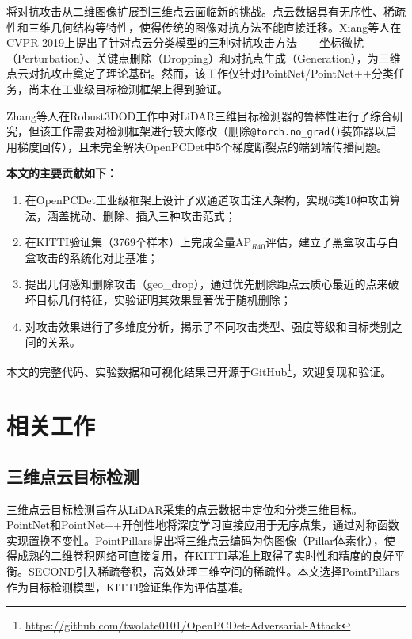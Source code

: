 ﻿\documentclass[12pt,a4paper]{ctexart}
\begin{document}
将对抗攻击从二维图像扩展到三维点云面临新的挑战。点云数据具有无序性、稀疏性和三维几何结构等特性，使得传统的图像对抗方法不能直接迁移。Xiang等人\cite{xiang2019generating}在CVPR 2019上提出了针对点云分类模型的三种对抗攻击方法——坐标微扰（Perturbation）、关键点删除（Dropping）和对抗点生成（Generation），为三维点云对抗攻击奠定了理论基础。然而，该工作仅针对PointNet/PointNet++分类任务，尚未在工业级目标检测框架上得到验证。

Zhang等人\cite{zhang2023robust3dod}在Robust3DOD工作中对LiDAR三维目标检测器的鲁棒性进行了综合研究，但该工作需要对检测框架进行较大修改（删除\texttt{@torch.no\_grad()}装饰器以启用梯度回传），且未完全解决OpenPCDet中5个梯度断裂点的端到端传播问题。

\textbf{本文的主要贡献如下：}
\begin{enumerate}[label=(\arabic*)]
  \item 在OpenPCDet工业级框架\cite{openpcdet2020}上设计了双通道攻击注入架构，实现6类10种攻击算法，涵盖扰动、删除、插入三种攻击范式；
  \item 在KITTI验证集（3769个样本）上完成全量$\text{AP}_{R40}$评估，建立了黑盒攻击与白盒攻击的系统化对比基准；
  \item 提出几何感知删除攻击（geo\_drop），通过优先删除距点云质心最近的点来破坏目标几何特征，实验证明其效果显著优于随机删除；
  \item 对攻击效果进行了多维度分析，揭示了不同攻击类型、强度等级和目标类别之间的关系。
\end{enumerate}

本文的完整代码、实验数据和可视化结果已开源于GitHub\footnote{\url{https://github.com/twolate0101/OpenPCDet-Adversarial-Attack}}，欢迎复现和验证。

\section{相关工作}

\subsection{三维点云目标检测}

三维点云目标检测旨在从LiDAR采集的点云数据中定位和分类三维目标。PointNet\cite{qi2017pointnet}和PointNet++\cite{qi2017pointnetplusplus}开创性地将深度学习直接应用于无序点集，通过对称函数实现置换不变性。PointPillars\cite{lang2019pointpillars}提出将三维点云编码为伪图像（Pillar体素化），使得成熟的二维卷积网络可直接复用，在KITTI基准上取得了实时性和精度的良好平衡。SECOND\cite{yan2018second}引入稀疏卷积，高效处理三维空间的稀疏性。本文选择PointPillars作为目标检测模型，KITTI验证集作为评估基准。
\end{document}
